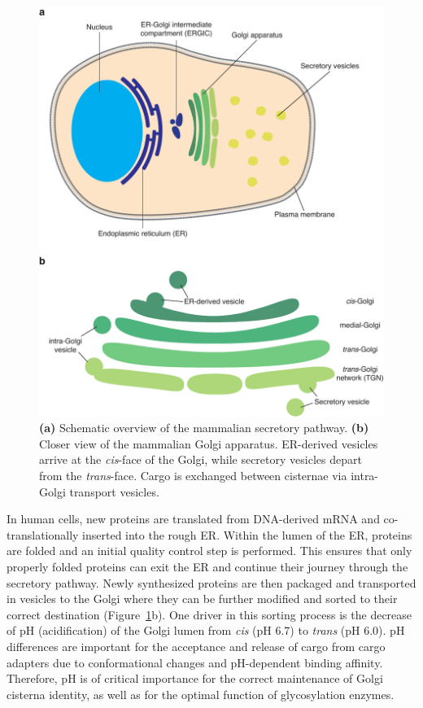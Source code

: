 \begin{figure}
    \includegraphics[keepaspectratio=true,width=\textwidth,height=\textheight]{chapters/chapter1/chapter1_Figure1.pdf}
    \caption{\textbf{(a)} Schematic overview of the mammalian secretory pathway. \textbf{(b)} Closer view of the mammalian Golgi apparatus. ER-derived vesicles arrive at the \emph{cis}-face of the Golgi, while secretory vesicles depart from the \emph{trans}-face. Cargo is exchanged between cisternae via intra-Golgi transport vesicles.}
    \label{fig:ch1fig1}
\end{figure}

In human cells, new proteins are translated from DNA-derived mRNA and co-translationally inserted into the rough ER. Within the lumen of the ER, proteins are folded and an initial quality control step is performed. This ensures that only properly folded proteins can exit the ER and continue their journey through the secretory pathway\cite{hetz_unfolded_2012}. Newly synthesized proteins are then packaged and transported in vesicles to the Golgi where they can be further modified and sorted to their correct destination (Figure~\ref{fig:ch1fig1}b). One driver in this sorting process is the decrease of pH (acidification) of the Golgi lumen from \emph{cis} (pH 6.7) to \emph{trans} (pH 6.0). pH differences are important for the acceptance and release of cargo from cargo adapters due to conformational changes and pH-dependent binding affinity\cite{brauer_structural_2019,wilson_ph-dependent_1993,ghosh_mannose_2003,olson_allosteric_2020}. Therefore, pH is of critical importance for the correct maintenance of Golgi cisterna identity\cite{linders_sugary_2020,fisher_bridging_2016,rivinoja_elevated_2009,maeda_chapter_2010}, as well as for the optimal function of glycosylation enzymes\cite{gawlitzek_ammonium_2000}.

